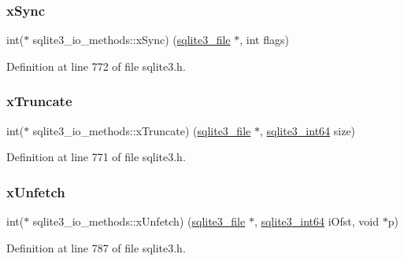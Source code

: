 \subsubsection{\texorpdfstring{x\+Sync}{xSync}}
{\footnotesize\ttfamily int($\ast$ sqlite3\+\_\+io\+\_\+methods\+::x\+Sync) (\mbox{\hyperlink{structsqlite3__file}{sqlite3\+\_\+file}} $\ast$, int flags)}



Definition at line 772 of file sqlite3.\+h.

\mbox{\label{structsqlite3__io__methods_abe797948913bfe94d4fab7246773af50}} 
\subsubsection{\texorpdfstring{x\+Truncate}{xTruncate}}
{\footnotesize\ttfamily int($\ast$ sqlite3\+\_\+io\+\_\+methods\+::x\+Truncate) (\mbox{\hyperlink{structsqlite3__file}{sqlite3\+\_\+file}} $\ast$, \mbox{\hyperlink{sqlite3_8h_a0a4d3e6c1ad46f90e746b920ab6ca0d2}{sqlite3\+\_\+int64}} size)}



Definition at line 771 of file sqlite3.\+h.

\mbox{\label{structsqlite3__io__methods_abebf1bbaa50bea56f0e37d0f66193bda}} 
\subsubsection{\texorpdfstring{x\+Unfetch}{xUnfetch}}
{\footnotesize\ttfamily int($\ast$ sqlite3\+\_\+io\+\_\+methods\+::x\+Unfetch) (\mbox{\hyperlink{structsqlite3__file}{sqlite3\+\_\+file}} $\ast$, \mbox{\hyperlink{sqlite3_8h_a0a4d3e6c1ad46f90e746b920ab6ca0d2}{sqlite3\+\_\+int64}} i\+Ofst, void $\ast$p)}



Definition at line 787 of file sqlite3.\+h.

\mbox{\label{structsqlite3__io__methods_a5ce75a5ca2df9c1edcaef74d4c0d7e38}} 
